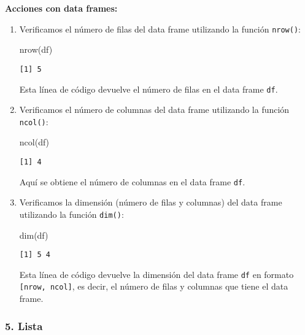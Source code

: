 \documentclass[
  a4paper,
]{article}
\newenvironment{Shaded}{}{}
\newcommand{\FunctionTok}[1]{\textcolor[rgb]{0.44,0.26,0.76}{#1}}
\newcommand{\NormalTok}[1]{\textcolor[rgb]{0.14,0.16,0.18}{#1}}
\begin{document}
\textbf{Acciones con data frames:}

\begin{enumerate}
\def\labelenumi{\arabic{enumi}.}
\item
  Verificamos el número de filas del data frame utilizando la función
  \texttt{nrow()}:

\begin{Shaded}
\begin{Highlighting}[]
\FunctionTok{nrow}\NormalTok{(df)}
\end{Highlighting}
\end{Shaded}

\begin{verbatim}
[1] 5
\end{verbatim}

  Esta línea de código devuelve el número de filas en el data frame
  \texttt{df}.
\item
  Verificamos el número de columnas del data frame utilizando la función
  \texttt{ncol()}:

\begin{Shaded}
\begin{Highlighting}[]
\FunctionTok{ncol}\NormalTok{(df)}
\end{Highlighting}
\end{Shaded}

\begin{verbatim}
[1] 4
\end{verbatim}

  Aquí se obtiene el número de columnas en el data frame \texttt{df}.
\item
  Verificamos la dimensión (número de filas y columnas) del data frame
  utilizando la función \texttt{dim()}:

\begin{Shaded}
\begin{Highlighting}[]
\FunctionTok{dim}\NormalTok{(df)}
\end{Highlighting}
\end{Shaded}

\begin{verbatim}
[1] 5 4
\end{verbatim}

  Esta línea de código devuelve la dimensión del data frame \texttt{df}
  en formato \texttt{{[}nrow,\ ncol{]}}, es decir, el número de filas y
  columnas que tiene el data frame.
\end{enumerate}

\subsubsection{5. Lista}\label{lista}
\end{document}
